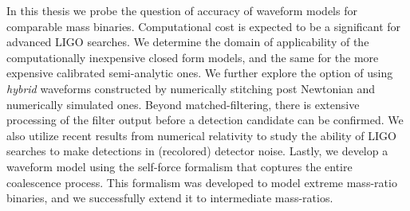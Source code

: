 In this thesis we probe the question of accuracy of waveform models for 
comparable mass binaries. Computational cost is expected to be a significant
for advanced LIGO searches. We determine the domain of applicability of the
computationally inexpensive closed form models, and the same for the more 
expensive calibrated semi-analytic ones. We further explore the option of 
using {\it hybrid} waveforms constructed by numerically stitching post 
Newtonian and numerically simulated ones. Beyond matched-filtering, there 
is extensive processing of the filter output before a detection candidate can
be confirmed. We also utilize recent results from numerical relativity to study
the ability of LIGO searches to make detections in (recolored) detector noise.
Lastly, we develop a waveform model using the self-force formalism 
that coptures the entire coalescence process. This formalism was developed to
model extreme mass-ratio binaries, and we successfully extend it to intermediate 
mass-ratios.
